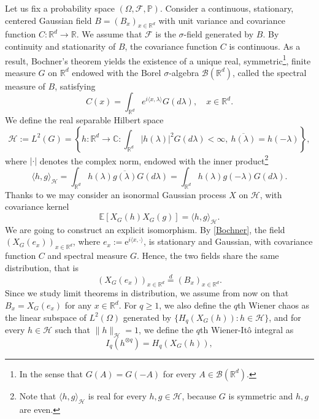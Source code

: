 \documentclass[12pt]{article}
\DeclareMathOperator{\1}{1}
\newcommand{\R}{\mathbb{R}}
\newcommand{\E}{\mathbb{E}}
\newcommand{\C}{\mathbb{C}}
\newcommand{\B}{\mathcal B}
\renewcommand{\L}{ L}
\newcommand{\os}[2]{\overset{#1}{#2}}
\theoremstyle{plain}
\theoremstyle{definition}
\begin{document}
Let us fix a probability space $(\Omega,\mathcal F, \mathbb P)$. Consider a continuous, stationary, centered Gaussian field $B=(B_{x})_{x\in \R^d}$ with unit variance and {covariance function} $C:\R^d\rightarrow\R$. We assume that $\mathcal F$ is the $\sigma$-field generated by $B$. By continuity and stationarity of $B$, the covariance function $C$ is continuous. As a result, Bochner's theorem yields the existence of a unique real, symmetric\footnote{In the sense that $G(A)=G(-A)$ for every $A\in\mathcal{B}(\R^d)$.}, finite measure $G$ on $\R^d$ endowed with the Borel $\sigma$-algebra $\B(\R^d)$, called the {spectral measure} of $B$, satisfying
\begin{equation}
    \label{Bochner}
    C(x)=\int_{\R^d}e^{i\langle x,\lambda \rangle}G(d\lambda),\quad x\in\R^d.
\end{equation}
We define the real separable Hilbert space 
\begin{equation}\label{equ:defL2G} 
\mathcal{H}:=\L^2(G)=\left\{h:\R^d\rightarrow \C : \int_{\R^d}|h(\lambda)|^2 G(d\lambda)<\infty, \ \overline{h(\lambda)}=h(-\lambda)\right\},
\end{equation}
where $|\cdot|$ denotes the complex norm, endowed with the inner product\footnote{Note that $\langle h,g\rangle_{\mathcal H}$  is real for every $h,g\in\mathcal{H}$, because $G$ is symmetric and $h,g$ are even.}
\begin{equation}
    \langle h,g\rangle_{\mathcal{H}}=\int_{\R^d}h(\lambda)\overline{g(\lambda)}G(d\lambda)=\int_{\R^d}h(\lambda)g(-\lambda)G(d\lambda).
\end{equation}
Thanks to \cite[Proposition 2.1.1]{bluebook} we may consider an isonormal Gaussian process $X$ on $\mathcal{H}$, with covariance kernel \begin{equation}
    \E\left[ X_G(h) X_G(g)\right]=\langle h,g \rangle_{\mathcal{H}}.
\end{equation}
We are going to construct an explicit isomorphism. By \eqref{Bochner}, the field $\left(X_G\left(e_x\right)\right)_{x\in\R^d}$, where $e_x:=\mathrm e^{i\langle x,\cdot \rangle}$, is stationary and Gaussian, with covariance function $C$ and spectral measure $G$. Hence, the two fields share the same distribution, that is \begin{equation}\label{equ:IGP}
    \left(X_G\left(e_x\right) \right)_{x\in\R^d} \os{d}{=} (B_x)_{x\in\R^d}.
\end{equation} 
Since we study limit theorems in distribution, we assume from now on that $B_x = X_G\left(e_x\right)$ for any $x\in\mathbb R^{d}$. For $q\ge 1$, we also define the $q$th Wiener chaos as the linear subspace of $\L^2(\Omega)$ generated by $\{ H_q(X_G(h)) : h\in \mathcal H\}$, and for every $h\in\mathcal H$ such that $\|h\|_{\mathcal H}=1$, we define the $q$th Wiener-It\^o integral as \begin{equation}\label{equ:WieItoInt}
    I_q(h^{\otimes q}) = H_q(X_G(h)),
\end{equation} 
\end{document}
